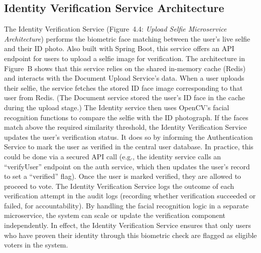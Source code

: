 \documentclass[a4paper,10pt]{report}
\begin{document}
\subsection{Identity Verification Service Architecture}
The Identity Verification Service (Figure~4.4: \emph{Upload Selfie Microservice Architecture}) performs the biometric face matching between the user’s live selfie and their ID photo. Also built with Spring Boot, this service offers an API endpoint for users to upload a selfie image for verification. The architecture in Figure~B shows that this service relies on the shared in-memory cache (Redis) and interacts with the Document Upload Service’s data. When a user uploads their selfie, the service fetches the stored ID face image corresponding to that user from Redis. (The Document service stored the user’s ID face in the cache during the upload stage.) The Identity service then uses OpenCV’s facial recognition functions to compare the selfie with the ID photograph. If the faces match above the required similarity threshold, the Identity Verification Service updates the user’s verification status. It does so by informing the Authentication Service to mark the user as verified in the central user database. In practice, this could be done via a secured API call (e.g., the identity service calls an “verifyUser” endpoint on the auth service, which then updates the user’s record to set a “verified” flag). Once the user is marked verified, they are allowed to proceed to vote. The Identity Verification Service logs the outcome of each verification attempt in the audit logs (recording whether verification succeeded or failed, for accountability). By handling the facial recognition logic in a separate microservice, the system can scale or update the verification component independently. In effect, the Identity Verification Service ensures that only users who have proven their identity through this biometric check are flagged as eligible voters in the system.
\end{document}
